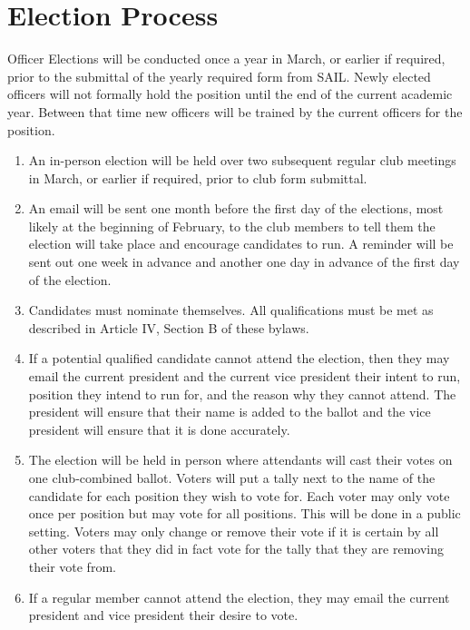 \documentclass[12pt]{article}
\begin{document}
\section{Election Process}
Officer Elections will be conducted once a year in March, or earlier if required, prior to the submittal of the yearly required form from SAIL. Newly elected officers will not formally hold the position until the end of the current academic year. Between that time new officers will be trained by the current officers for the position.
\begin{enumerate}[label=(\roman*)]
    \item An in-person election will be held over two subsequent regular club meetings in March, 
    or earlier if required, prior to club form submittal. 
    \item An email will be sent one month before the first day of the elections, most likely at the beginning of February, 
    to the club members to tell them the election will take place and encourage candidates to run. 
    A reminder will be sent out one week in advance and another one day in advance of the first day of the election.
    \item Candidates must nominate themselves. 
    All qualifications must be met as described in Article IV, Section B of these bylaws. 
    \item If a potential qualified candidate cannot attend the election, 
    then they may email the current president and the current vice president their intent to run, 
    position they intend to run for, and the reason why they cannot attend. 
    The president will ensure that their name is added to the ballot and the vice president will ensure that it is done accurately.
    \item The election will be held in person where attendants will cast their votes on one club-combined ballot. 
    Voters will put a tally next to the name of the candidate for each position they wish to vote for. 
    Each voter may only vote once per position but may vote for all positions. 
    This will be done in a public setting. 
    Voters may only change or remove their vote if it is certain by all other voters that they did in fact vote for the tally that they are removing their vote from.
    \item If a regular member cannot attend the election, 
    they may email the current president and vice president their desire to vote. 

\end{enumerate}
\end{document}
